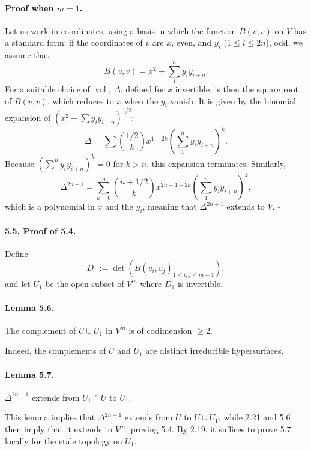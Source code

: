 \documentclass[11pt]{article}
\begin{document}
\paragraph{Proof when $m=1$.}
Let us work in coordinates, using a basis in which the function $B(v,v)$ on $V$ has a standard form: if the coordinates of $v$ are $x$, even, and $y_i$ ($1\leq i\leq 2n$), odd, we assume that
\begin{equation}
\label{eq:541}
B(v,v)=x^2+\sum_1^n y_i y_{i+n}.
\end{equation}
For a suitable choice of $\operatorname{vol}$, $\Delta$, defined for $x$ invertible, is then the square root of $B(v,v)$, which reduces to $x$ when the $y_i$ vanish. It is given by the binomial expansion of $(x^2+\sum y_i y_{i+n})^{1/2}$:
\begin{equation}
\label{eq:542}
\Delta=\sum \binom{1/2}{k} x^{1-2k}\left(\sum_1^n y_i y_{i+n}\right)^k.
\end{equation}
Because $(\sum_1^n y_i y_{i+n})^k=0$ for $k>n$, this expansion terminates. Similarly,
\begin{equation}
\label{eq:543}
\Delta^{2n+1}=\sum_{k=0}^n \binom{n+1/2}{k}x^{2n+1-2k}\left(\sum_1^n y_i y_{i+n}\right)^k,
\end{equation}
which is a polynomial in $x$ and the $y_i$, meaning that $\Delta^{2n+1}$ extends to $V$. \hfill $\square$

\paragraph{5.5. Proof of 5.4.}
Define
\[
D_1:=\det(B(v_i,v_j)_{1\leq i,j\leq m-1}),
\]
and let $U_1$ be the open subset of $V^m$ where $D_1$ is invertible.

\paragraph{Lemma 5.6.}
The complement of $U\cup U_1$ in $V^m$ is of codimension $\geq2$.

Indeed, the complements of $U$ and $U_1$ are distinct irreducible hypersurfaces.

\paragraph{Lemma 5.7.}
$\Delta^{2n+1}$ extends from $U_1\cap U$ to $U_1$.

This lemma implies that $\Delta^{2n+1}$ extends from $U$ to $U\cup U_1$, while 2.21 and 5.6 then imply that it extends to $V^m$, proving 5.4. By 2.19, it suffices to prove 5.7 locally for the etale topology on $U_1$.
\end{document}
